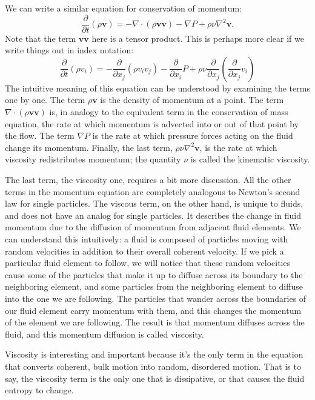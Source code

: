 We can write a similar equation for conservation of momentum:
\begin{equation}
\label{eq:momentum}
\frac{\partial}{\partial t}(\rho \mathbf{v}) = -\nabla \cdot(\rho \mathbf{v v}) - \nabla P + \rho \nu \nabla^2 \mathbf{v}.
\end{equation}
Note that the term $\mathbf{vv}$ here is a tensor product. This is perhaps more clear if we write things out in index notation:
\begin{equation}
\frac{\partial}{\partial t}(\rho v_i) = -\frac{\partial}{\partial x_j} (\rho v_i v_j) - \frac{\partial}{\partial x_i} P
+ \rho \nu \frac{\partial}{\partial x_j}\left(\frac{\partial}{\partial x_j} v_i\right)
\end{equation}
The intuitive meaning of this equation can be understood by examining the terms one by one. The term $\rho\mathbf{v}$ is the density of momentum at a point. The term $\nabla \cdot(\rho \mathbf{v v})$ is, in analogy to the equivalent term in the conservation of mass equation, the rate at which momentum is advected into or out of that point by the flow. The term $\nabla P$ is the rate at which pressure forces acting on the fluid change its momentum. Finally, the last term, $\rho \nu \nabla^2 \mathbf{v}$, is the rate at which viscosity redistributes momentum; the quantity $\nu$ is called the kinematic viscosity.

The last term, the viscosity one, requires a bit more discussion. All the other terms in the momentum equation are completely analogous to Newton's second law for single particles. The viscous term, on the other hand, is unique to fluids, and does not have an analog for single particles. It describes the change in fluid momentum due to the diffusion of momentum from adjacent fluid elements. We can understand this intuitively: a fluid is composed of particles moving with random velocities in addition to their overall coherent velocity. If we pick a particular fluid element to follow, we will notice that these random velocities cause some of the particles that make it up to diffuse across its boundary to the neighboring element, and some particles from the neighboring element to diffuse into the one we are following. The particles that wander across the boundaries of our fluid element carry momentum with them, and this changes the momentum of the element we are following. The result is that momentum diffuses across the fluid, and this momentum diffusion is called viscosity.

Viscosity is interesting and important because it's the only term in the equation that converts coherent, bulk motion into random, disordered motion. That is to say, the viscosity term is the only one that is dissipative, or that causes the fluid entropy to change. 

